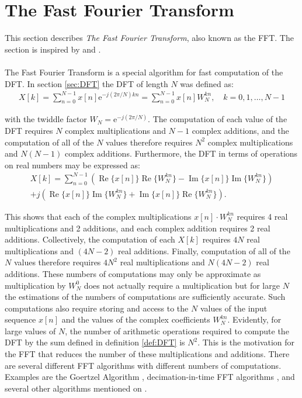 \section{The Fast Fourier Transform} \label{sec:FFT}
This section describes \textit{The Fast Fourier Transform}, also known as the FFT. The section is inspired by \cite{pages 750, 755-763, DTSP} and \cite{page 303, FSP}.
\\ \\
The Fast Fourier Transform is a special algorithm for fast computation of the DFT. In section \ref{sec:DFT} the DFT of length $N$ was defined as:
\begin{align*}
X[k] = \sum_{n=0}^{N-1} x[n] \text{e}^{-j(2\pi/N)kn} = \sum_{n=0}^{N-1} x[n] W_N^{kn}, \quad k = 0, 1, \dots, N-1
\end{align*}

with the twiddle factor $W_N = \text{e}^{-j(2\pi/N)}$. The computation of each value of the DFT requires $N$ complex multiplications and $N-1$ complex additions, and the computation of all of the $N$ values therefore requires $N^2$ complex multiplications and $N(N-1)$ complex additions. Furthermore, the DFT in terms of operations on real numbers may be expressed as:
\begin{align*}
X[k] = \sum_{n=0}^{N-1} \left( \operatorname{Re}\{x[n]\} \operatorname{Re} \{W_N^{kn}\} - \operatorname{Im}\{x[n]\}\operatorname{Im} \{W_N^{kn}\} \right) \\ + j \left( \operatorname{Re} \{x[n]\}\operatorname{Im} \{W_N^{kn}\} + \operatorname{Im} \{x[n]\} \operatorname{Re}\{W_N^{kn}\}\right).
\end{align*}

This shows that each of the complex multiplications $x[n] \cdot W_N^{kn}$ requires 4 real multiplications and 2 additions, and each complex addition requires 2 real additions. Collectively, the computation of each $X[k]$ requires $4N$ real multiplications and $(4N-2)$ real additions. Finally, computation of all of the $N$ values therefore requires $4N^2$ real multiplications and $N(4N-2)$ real additions. These numbers of computations may only be approximate as multiplication by $W_N^0$ does not actually require a multiplication but for large $N$ the estimations of the numbers of computations are sufficiently accurate. Such computations also require storing and access to the $N$ values of the input sequence $x[n]$ and the values of the complex coefficients $W_N^{kn}$. Evidently, for large values of $N$, the number of arithmetic operations required to compute the DFT by the sum defined in definition \ref{def:DFT} is $N^2$. This is the motivation for the FFT that reduces the number of these multiplications and additions. There are several different FFT algorithms with different numbers of computations. Examples are the Goertzel Algorithm \cite{page 751, DTSP}, decimation-in-time FFT algorithms \cite{page 755, DTSP}, and several other algorithms mentioned on \cite{pages 306-307, FSP}.

